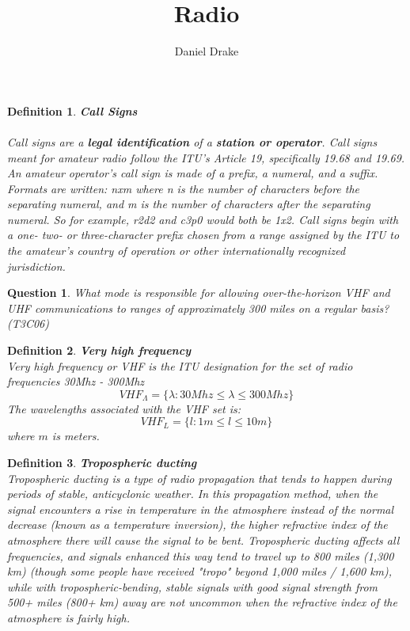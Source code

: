 \documentclass[12pt]{extarticle}
\title{Radio}
\author{Daniel Drake}
\theoremstyle{plain}
\theoremstyle{plain}
\theoremstyle{plain}
\theoremstyle{Definition}
\newtheorem{def.}{Definition}[section]
\theoremstyle{Definition}
\theoremstyle{Definition}
\newtheorem{quest}{Question}[section]
\theoremstyle{plain}
\theoremstyle{plain}
\begin{document}
	\maketitle
	\begin{def.} \textbf{Call Signs} \\ \\
		Call signs are a \textbf{legal identification }of a \textbf{station or operator}. Call signs meant for amateur radio follow the ITU's Article 19, specifically 19.68 and 19.69. An amateur operator's call sign is made of a prefix, a numeral, and a suffix. Formats are written: nxm where n is the number of characters before the separating numeral, and m is the number of characters after the separating numeral. So for example, r2d2 and c3p0 would both be 1x2. Call signs begin with a one- two- or three-character prefix chosen from a range assigned by the ITU to the amateur's country of operation or other internationally recognized jurisdiction.
	\end{def.}

	\begin{quest}
		What mode is responsible for allowing over-the-horizon VHF and UHF communications to ranges of approximately 300 miles on a regular basis? (T3C06)
	\end{quest}

	\begin{def.} \textbf{Very high frequency} \\ 
		Very high frequency or VHF is the ITU designation for the set of radio frequencies 30Mhz - 300Mhz
		$$VHF_\Lambda = \{\lambda : 30 Mhz \leq \lambda \leq 300Mhz\}$$
		The wavelengths associated with the VHF set is: 
		$$VHF_L = \{l : 1m \leq l \leq 10m\}$$
		where $m$ is meters. 
	\end{def.}

	\begin{def.} \textbf{Tropospheric ducting} \\ 
		Tropospheric ducting is a type of radio propagation that tends to happen during periods of stable, anticyclonic weather. In this propagation method, when the signal encounters a rise in temperature in the atmosphere instead of the normal decrease (known as a temperature inversion), the higher refractive index of the atmosphere there will cause the signal to be bent. Tropospheric ducting affects all frequencies, and signals enhanced this way tend to travel up to 800 miles (1,300 km) (though some people have received "tropo" beyond 1,000 miles / 1,600 km), while with tropospheric-bending, stable signals with good signal strength from 500+ miles (800+ km) away are not uncommon when the refractive index of the atmosphere is fairly high. 
	\end{def.}
\end{document}
